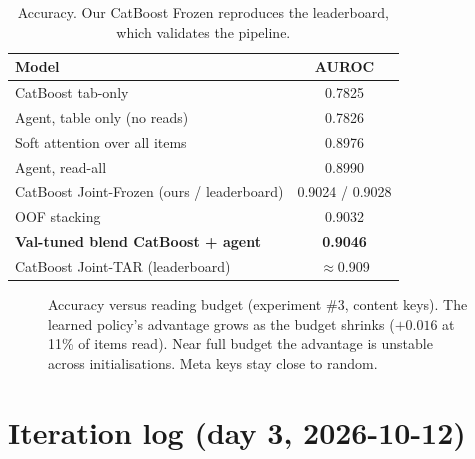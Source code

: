 \documentclass[11pt,a4paper]{article}
\begin{document}
\begin{table}[H]
\centering
\begin{tabular}{lc}
\toprule
Model & AUROC \\
\midrule
CatBoost tab-only & 0.7825 \\
Agent, table only (no reads) & 0.7826 \\
Soft attention over all items & 0.8976 \\
Agent, read-all & 0.8990 \\
CatBoost Joint-Frozen (ours / leaderboard) & 0.9024 / 0.9028 \\
OOF stacking & 0.9032 \\
\textbf{Val-tuned blend CatBoost + agent} & \textbf{0.9046} \\
\midrule
CatBoost Joint-TAR (leaderboard) & $\approx$0.909 \\
\bottomrule
\end{tabular}
\caption{Accuracy. Our CatBoost Frozen reproduces the leaderboard, which validates the pipeline.}
\end{table}

\begin{figure}[H]
\centering
{}
\caption{Accuracy versus reading budget (experiment \#3, content keys).
The learned policy's advantage grows as the budget shrinks ($+0.016$ at 11\% of items read).
Near full budget the advantage is unstable across initialisations.
Meta keys stay close to random.}
\end{figure}

\section{Iteration log (day 3, 2026-10-12)}
\end{document}
